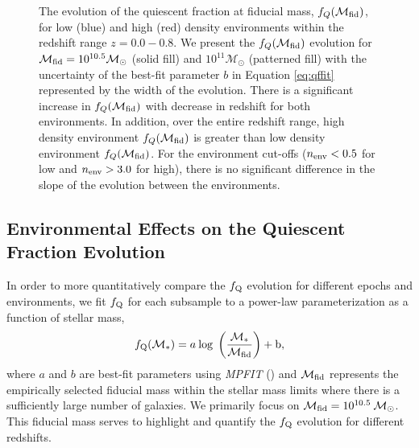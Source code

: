 \documentclass{emulateapj}
\begin{document}
\begin{figure}
    \begin{center}
        \leavevmode
        \caption{The evolution of the quiescent fraction at fiducial mass, $f_{Q}(\mathcal{M}_{\rm{fid}})$, for low (blue) and high (red) density environments within the redshift range $z = 0.0 - 0.8$. We present the $f_{Q}(\mathcal{M}_{\rm{fid}})$ evolution for $\mathcal{M}_{\rm{fid}} = 10^{10.5} \mathcal{M}_\odot$ (solid fill) and $10^{11} \mathcal{M}_\odot$ (patterned fill) with the uncertainty of the best-fit parameter $b$ in Equation \ref{eq:qffit} represented by the width of the evolution. There is a significant increase in $f_{Q}(\mathcal{M}_{\rm{fid}})$ with decrease in redshift for both environments. In addition, over the entire redshift range, high density environment $f_{Q}(\mathcal{M}_{\rm{fid}})$ is greater than low density environment $f_{Q}(\mathcal{M}_{\rm{fid}})$. For the environment cut-offs ($n_{\rm{env}} < 0.5$ for low and $n_{\rm{env}} > 3.0$ for high), there is no significant difference in the slope of the evolution between the environments.}         \label{fig:qffit}
    \end{center}
\end{figure}

\subsection{Environmental Effects on the Quiescent Fraction Evolution} \label{sec:env_qf_evol}
In order to more quantitatively compare the $f_{\rm{Q}}$ evolution for different epochs and environments, we fit $f_{\rm{Q}}$ for each subsample to a power-law parameterization as a function of stellar mass, 
\begin{equation} \label{eq:qffit}
f_{\rm{Q}}(\mathcal{M}_{*}) = a \: \rm{log} \; \left(\frac{ \mathcal{M}_{*}}{\mathcal{M}_{\rm{fid}}} \right)+b,
\end{equation}
where $a$ and $b$ are best-fit parameters using {\em MPFIT} (\cite{Markwardt:2009aa}) and $\mathcal{M}_{\rm{fid}}$ represents the empirically selected fiducial mass within the stellar mass limits where there is a sufficiently large number of galaxies. We primarily focus on $\mathcal{M}_{\rm{fid}} = 10^{10.5} \: \mathcal{M}_{\odot}$. This fiducial mass serves to highlight and quantify the $f_{\rm{Q}}$ evolution for different redshifts. 
\end{document}
